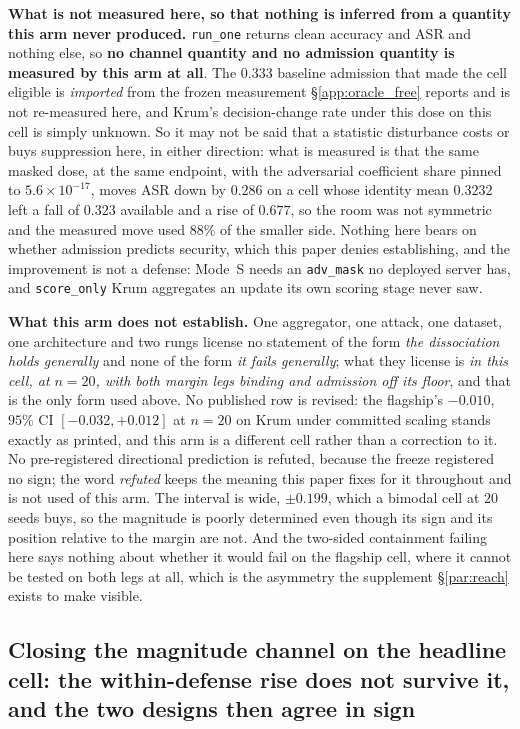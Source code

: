 \documentclass{article}
\begin{document}
\textbf{What is not measured here, so that nothing is inferred from a quantity this arm never produced.} \texttt{run\_one} returns clean accuracy and ASR and nothing else, so \textbf{no channel quantity and no admission quantity is measured by this arm at all}. The $0.333$ baseline admission that made the cell eligible is \emph{imported} from the frozen measurement §\ref{app:oracle_free} reports and is not re-measured here, and Krum's decision-change rate under this dose on this cell is simply unknown. So it may not be said that a statistic disturbance costs or buys suppression here, in either direction: what is measured is that the same masked dose, at the same endpoint, with the adversarial coefficient share pinned to $5.6{\times}10^{-17}$, moves ASR down by $0.286$ on a cell whose identity mean $0.3232$ left a fall of $0.323$ available and a rise of $0.677$, so the room was not symmetric and the measured move used $88\%$ of the smaller side. Nothing here bears on whether admission predicts security, which this paper denies establishing, and the improvement is not a defense: Mode~S needs an \texttt{adv\_mask} no deployed server has, and \texttt{score\_only} Krum aggregates an update its own scoring stage never saw.

\textbf{What this arm does not establish.} One aggregator, one attack, one dataset, one architecture and two rungs license no statement of the form \emph{the dissociation holds generally} and none of the form \emph{it fails generally}; what they license is \emph{in this cell, at $n{=}20$, with both margin legs binding and admission off its floor}, and that is the only form used above. No published row is revised: the flagship's $-0.010$, $95\%$ CI $[-0.032,+0.012]$ at $n{=}20$ on Krum under committed scaling stands exactly as printed, and this arm is a different cell rather than a correction to it. No pre-registered directional prediction is refuted, because the freeze registered no sign; the word \emph{refuted} keeps the meaning this paper fixes for it throughout and is not used of this arm. The interval is wide, $\pm0.199$, which a bimodal cell at $20$ seeds buys, so the magnitude is poorly determined even though its sign and its position relative to the margin are not. And the two-sided containment failing here says nothing about whether it would fail on the flagship cell, where it cannot be tested on both legs at all, which is the asymmetry the supplement §\ref{par:reach} exists to make visible.

\subsection{Closing the magnitude channel on the headline cell: the within-defense rise does not survive it, and the two designs then agree in sign}
\label{app:magnitude_coordmedian}
\end{document}
